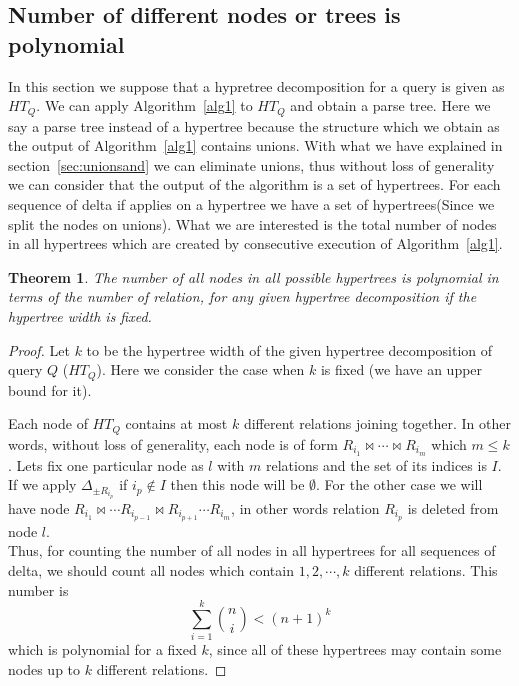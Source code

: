 \documentclass[12pt]{article}
\newtheorem{theorem}{Theorem}
\begin{document}
\subsection{Number of different nodes or trees is polynomial}
\label{sec:theorem1}
In this section we suppose that a hypretree decomposition for a query is given as $HT_{Q}$. We can apply Algorithm~\ref{alg1} to $HT_{Q}$ and obtain a parse tree. Here we say a parse tree instead of a hypertree because the structure which we obtain as the output of Algorithm~\ref{alg1} contains unions. With what we have explained in section~\ref{sec:unionsand} we can eliminate unions, thus without loss of generality we can consider that the output of the algorithm is a set of hypertrees. For each sequence of delta if applies on a hypertree we have a set of hypertrees(Since we split the nodes on unions). What we are interested is the total number of nodes in all hypertrees which are created by consecutive execution of Algorithm~\ref{alg1}.  
\begin{theorem}
\label{thm:1}
The number of all nodes in all possible hypertrees is polynomial in terms of the number of relation, for any given hypertree decomposition if the hypertree width is fixed. 
\end{theorem}
\begin{proof}
Let $k$ to be the hypertree width of the given hypertree decomposition of query $Q$ ($HT_{Q}$). Here we consider the case when $k$ is fixed (we have an upper bound for it).

Each node of $HT_{Q}$ contains at most $k$ different relations joining together. In other words, without loss of generality, each node is of form $R_{i_{1}}\Join\cdots\Join R_{i_{m}}$ which $m\leq k$. Lets fix one particular node as $l$ with $m$ relations and the set of its indices is $I$. If we apply $\Delta_{\pm R_{i_{p}}}$ if $i_{p}\not\in I$ then this node will be $\emptyset$. For the other case we will have node $R_{i_{1}}\Join\cdots R_{i_{p-1}}\Join R_{i_{p+1}}\cdots R_{i_{m}}$, in other words relation $R_{i_{p}}$ is deleted from node $l$.\\
Thus, for counting the number of all nodes in all hypertrees for all sequences of delta, we should count all nodes which contain $1,2,\cdots,k$ different relations. This number is 
\begin{equation}
\sum_{i=1}^{k}{\binom{n}{i}}<(n+1)^{k}
\end{equation}
which is polynomial for a fixed $k$, since all of these hypertrees may contain some nodes up to $k$ different relations. 

\end{proof}
\end{document}
